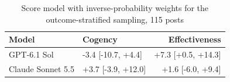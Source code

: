 \begin{table}[htbp]
\centering
\small
\caption{Score model with inverse-probability weights for the outcome-stratified sampling, 115 posts}
\label{tab:S2_score_weighted}
\begin{tabular}{llr}
\toprule
Model & Cogency & Effectiveness \\
\midrule
GPT-6.1 Sol & -3.4 [-10.7, +4.4] & +7.3 [+0.5, +14.3] \\
Claude Sonnet 5.5 & +3.7 [-3.9, +12.0] & +1.6 [-6.0, +9.4] \\
\bottomrule
\end{tabular}
\end{table}
